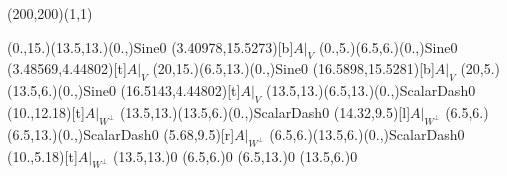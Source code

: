 \unitlength=1bp%

\begin{feynartspicture}(200,200)(1,1)

\FADiagram{}
\FAProp(0.,15.)(13.5,13.)(0.,){Sine}{0}
\FALabel(3.40978,15.5273)[b]{$A|_V$}
\FAProp(0.,5.)(6.5,6.)(0.,){Sine}{0}
\FALabel(3.48569,4.44802)[t]{$A|_V$}
\FAProp(20,15.)(6.5,13.)(0.,){Sine}{0}
\FALabel(16.5898,15.5281)[b]{$A|_V$}
\FAProp(20,5.)(13.5,6.)(0.,){Sine}{0}
\FALabel(16.5143,4.44802)[t]{$A|_V$}
\FAProp(13.5,13.)(6.5,13.)(0.,){ScalarDash}{0}
\FALabel(10.,12.18)[t]{$A|_{W^\perp}$}
\FAProp(13.5,13.)(13.5,6.)(0.,){ScalarDash}{0}
\FALabel(14.32,9.5)[l]{$A|_{W^\perp}$}
\FAProp(6.5,6.)(6.5,13.)(0.,){ScalarDash}{0}
\FALabel(5.68,9.5)[r]{$A|_{W^\perp}$}
\FAProp(6.5,6.)(13.5,6.)(0.,){ScalarDash}{0}
\FALabel(10.,5.18)[t]{$A|_{W^\perp}$}
\FAVert(13.5,13.){0}
\FAVert(6.5,6.){0}
\FAVert(6.5,13.){0}
\FAVert(13.5,6.){0}
\end{feynartspicture}

